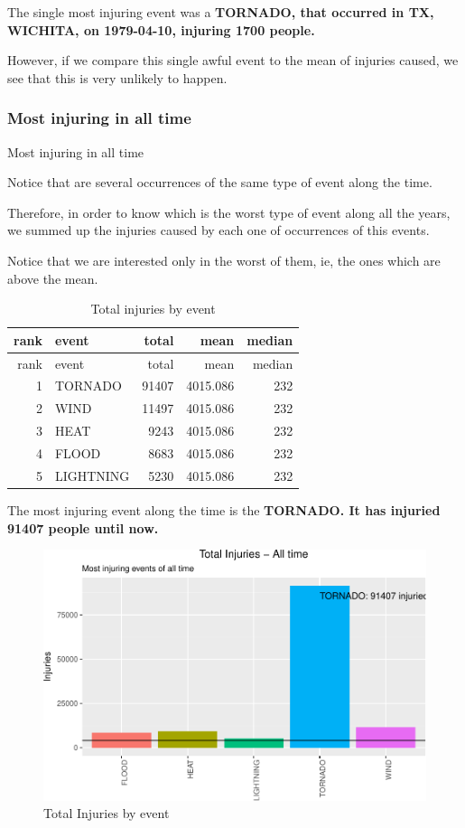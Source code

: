 \documentclass[]{article}
\begin{document}
The single most injuring event was a \textbf{TORNADO, that occurred in
TX, WICHITA, on 1979-04-10, injuring 1700 people.}

However, if we compare this single awful event to the mean of injuries
caused, we see that this is very unlikely to happen.

\subsubsection{Most injuring in all
time}\label{most-injuring-in-all-time}

Most injuring in all time

Notice that are several occurrences of the same type of event along the
time.

Therefore, in order to know which is the worst type of event along all
the years, we summed up the injuries caused by each one of occurrences
of this events.

Notice that we are interested only in the worst of them, ie, the ones
which are above the mean.

\begin{longtable}[]{@{}rlrrr@{}}
\caption{Total injuries by event}\tabularnewline
\toprule
rank & event & total & mean & median\tabularnewline
\midrule
\endfirsthead
\toprule
rank & event & total & mean & median\tabularnewline
\midrule
\endhead
1 & TORNADO & 91407 & 4015.086 & 232\tabularnewline
2 & WIND & 11497 & 4015.086 & 232\tabularnewline
3 & HEAT & 9243 & 4015.086 & 232\tabularnewline
4 & FLOOD & 8683 & 4015.086 & 232\tabularnewline
5 & LIGHTNING & 5230 & 4015.086 & 232\tabularnewline
\bottomrule
\end{longtable}

The most injuring event along the time is the \textbf{TORNADO. It has
injuried 91407 people until now.}

\begin{figure}[htbp]
\centering
\includegraphics{readme_files/figure-latex/injuring-all-plot-1.pdf}
\caption{Total Injuries by event}
\end{figure}
\end{document}

